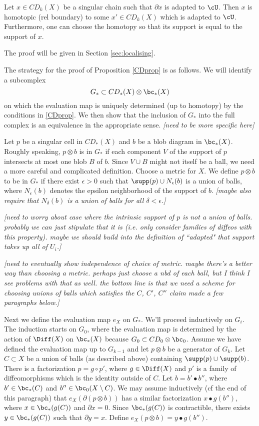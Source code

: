 \documentclass[11pt,leqno]{amsart}
\def\bd{\partial}
\def\sub{\subset}
\def\setmin{\setminus}
\def\nn#1{{{\it \small [#1]}}}
\begin{document}
\begin{lemma}  \label{extension_lemma}
Let $x \in CD_k(X)$ be a singular chain such that $\bd x$ is adapted to $\cU$.
Then $x$ is homotopic (rel boundary) to some $x' \in CD_k(X)$ which is adapted to $\cU$.
Furthermore, one can choose the homotopy so that its support is equal to the support of $x$.
\end{lemma}

The proof will be given in Section \ref{sec:localising}.

\medskip

The strategy for the proof of Proposition \ref{CDprop} is as follows.
We will identify a subcomplex
\[
    G_* \sub CD_*(X) \otimes \bc_*(X)
\]
on which the evaluation map is uniquely determined (up to homotopy) by the conditions
in \ref{CDprop}.
We then show that the inclusion of $G_*$ into the full complex
is an equivalence in the appropriate sense.
\nn{need to be more specific here}

Let $p$ be a singular cell in $CD_*(X)$ and $b$ be a blob diagram in $\bc_*(X)$.
Roughly speaking, $p\otimes b$ is in $G_*$ if each component $V$ of the support of $p$
intersects at most one blob $B$ of $b$.
Since $V \cup B$ might not itself be a ball, we need a more careful and complicated definition.
Choose a metric for $X$.
We define $p\otimes b$ to be in $G_*$ if there exist $\epsilon > 0$ such that
$\supp(p) \cup N_\epsilon(b)$ is a union of balls, where $N_\epsilon(b)$ denotes the epsilon
neighborhood of the support of $b$.
\nn{maybe also require that $N_\delta(b)$ is a union of balls for all $\delta<\epsilon$.}

\nn{need to worry about case where the intrinsic support of $p$ is not a union of balls.
probably we can just stipulate that it is (i.e. only consider families of diffeos with this property).
maybe we should build into the definition of ``adapted" that support takes up all of $U_i$.}

\nn{need to eventually show independence of choice of metric.  maybe there's a better way than
choosing a metric.  perhaps just choose a nbd of each ball, but I think I see problems
with that as well.
the bottom line is that we need a scheme for choosing unions of balls
which satisfies the $C$, $C'$, $C''$ claim made a few paragraphs below.}

Next we define the evaluation map $e_X$ on $G_*$.
We'll proceed inductively on $G_i$.
The induction starts on $G_0$, where the evaluation map is determined
by the action of $\Diff(X)$ on $\bc_*(X)$
because $G_0 \sub CD_0\otimes \bc_0$.
Assume we have defined the evaluation map up to $G_{k-1}$ and
let $p\otimes b$ be a generator of $G_k$.
Let $C \sub X$ be a union of balls (as described above) containing $\supp(p)\cup\supp(b)$.
There is a factorization $p = g \circ p'$, where $g\in \Diff(X)$ and $p'$ is a family of diffeomorphisms which is the identity outside of $C$.
Let $b = b'\bullet b''$, where $b' \in \bc_*(C)$ and $b'' \in \bc_0(X\setmin C)$.
We may assume inductively 
(cf the end of this paragraph)
that $e_X(\bd(p\otimes b))$ has a similar factorization $x\bullet g(b'')$, where
$x \in \bc_*(g(C))$ and $\bd x = 0$.
Since $\bc_*(g(C))$ is contractible, there exists $y \in \bc_*(g(C))$ such that $\bd y = x$.
Define $e_X(p\otimes b) = y\bullet g(b'')$.
\end{document}
